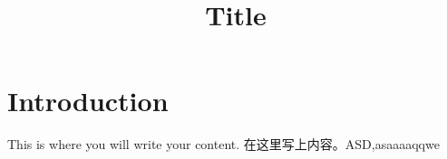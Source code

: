\documentclass{article}
\title{Title}
\author{}
\begin{document}
\maketitle{}
\section{Introduction}
This is where you will write your content. 在这里写上内容。ASD,asaaaaqqwe
\end{document}
